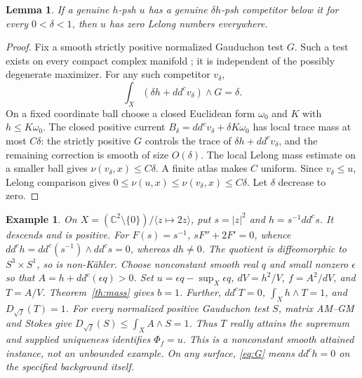 \documentclass[11pt]{article}
\newcommand{\ddc}{dd^c}
\newcommand{\1}{\mathbf 1}
\newtheorem{lemma}[theorem]{Lemma}
\newtheorem{example}[theorem]{Example}
\theoremstyle{remark}\newtheorem{remark}[theorem]{Remark}
\begin{document}
\begin{lemma}\label{lem:lelong}
If a genuine $h$-psh $u$ has a genuine $\delta h$-psh competitor below it
for every $0<\delta<1$, then $u$ has zero Lelong numbers everywhere.
\end{lemma}
\begin{proof}
Fix a smooth strictly positive normalized Gauduchon test $G$.
Such a test exists on every compact complex manifold
\cite[Theorem 2, pp.~132--133]{Gaud}; it is independent of the
possibly degenerate maximizer.
For any such competitor $v_\delta$,
\[
 \int_X(\delta h+\ddc v_\delta)\wedge G=\delta.
\]
On a fixed coordinate ball choose a closed Euclidean form $\omega_0$ and
$K$ with $h\leq K\omega_0$. The closed positive current
$B_\delta=\ddc v_\delta+\delta K\omega_0$ has local trace mass at most
$C\delta$: the strictly positive $G$ controls the trace of
$\delta h+\ddc v_\delta$, and the remaining correction is smooth of size
$O(\delta)$. The local Lelong mass estimate on a smaller ball gives
$\nu(v_\delta,x)\leq C\delta$. A finite atlas makes $C$ uniform.
Since $v_\delta\leq u$, Lelong comparison gives
$0\leq\nu(u,x)\leq\nu(v_\delta,x)\leq C\delta$.
Let $\delta$ decrease to zero.
\end{proof}

\begin{example}\label{ex:hopf}
On $X=(\mathbb C^2\setminus\{0\})/\langle z\mapsto2z\rangle$,
put $s=|z|^2$ and $h=s^{-1}\ddc s$. It descends and is positive.
For $F(s)=s^{-1}$, $sF''+2F'=0$, whence
$\ddc h=\ddc(s^{-1})\wedge\ddc s=0$, whereas $dh\ne0$.
The quotient is diffeomorphic to $S^3\times S^1$, so is non-K\"ahler.
Choose nonconstant smooth real $q$ and small nonzero $\epsilon$ so that
$A=h+\ddc(\epsilon q)>0$. Set $u=\epsilon q-\sup_X\epsilon q$,
$dV=h^2/V$, $f=A^2/dV$, and $T=A/V$.
Theorem~\ref{th:mass} gives $b=1$. Further,
$\ddc T=0$, $\int_Xh\wedge T=1$, and $D_{\sqrt f}(T)=1$.
For every normalized positive Gauduchon test $S$, matrix AM--GM and Stokes
give $D_{\sqrt f}(S)\leq\int_XA\wedge S=1$.
Thus $T$ really attains the supremum and supplied uniqueness identifies
$\Phi_f=u$. This is a nonconstant smooth attained instance, not an
unbounded example. On any surface, \eqref{eq:G} means $\ddc h=0$ on the
specified background itself.
\end{example}
\end{document}
